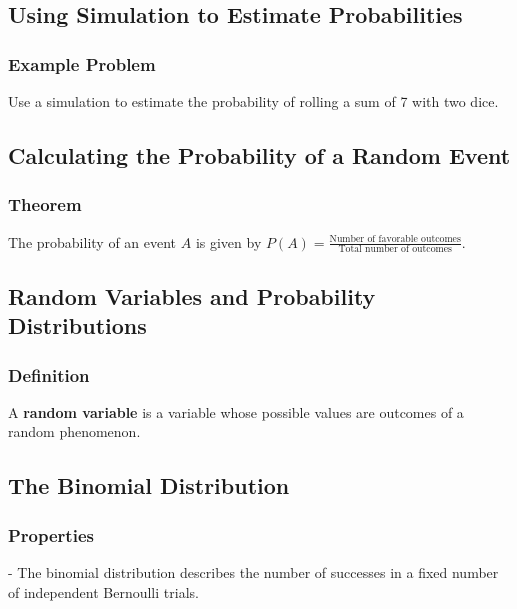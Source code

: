 \subsection{Using Simulation to Estimate Probabilities}
\subsubsection{Example Problem}
\begin{example}
Use a simulation to estimate the probability of rolling a sum of 7 with two dice.
\end{example}

\subsection{Calculating the Probability of a Random Event}
\subsubsection{Theorem}
\begin{theorem}
The probability of an event \( A \) is given by \( P(A) = \frac{\text{Number of favorable outcomes}}{\text{Total number of outcomes}} \).
\end{theorem}

\subsection{Random Variables and Probability Distributions}
\subsubsection{Definition}
\begin{definition}
A \textbf{random variable} is a variable whose possible values are outcomes of a random phenomenon.
\end{definition}

\subsection{The Binomial Distribution}
\subsubsection{Properties}
\begin{properties}
- The binomial distribution describes the number of successes in a fixed number of independent Bernoulli trials.
\end{properties}

